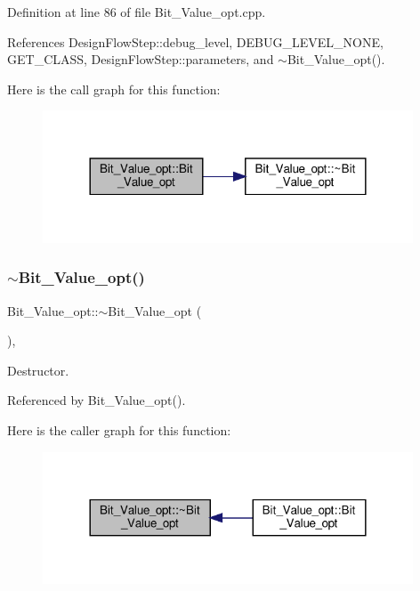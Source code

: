 Definition at line 86 of file Bit\+\_\+\+Value\+\_\+opt.\+cpp.



References Design\+Flow\+Step\+::debug\+\_\+level, D\+E\+B\+U\+G\+\_\+\+L\+E\+V\+E\+L\+\_\+\+N\+O\+NE, G\+E\+T\+\_\+\+C\+L\+A\+SS, Design\+Flow\+Step\+::parameters, and $\sim$\+Bit\+\_\+\+Value\+\_\+opt().

Here is the call graph for this function\+:
\nopagebreak
\begin{figure}[H]
\begin{center}
\leavevmode
\includegraphics[width=312pt]{dc/d5b/classBit__Value__opt_aa7b2660093d2f3b18277d05e76750df4_cgraph}
\end{center}
\end{figure}
\mbox{\label{classBit__Value__opt_a1b2ac3976ebd70c6afdc8d6ec1176b3d}} 
\subsubsection{\texorpdfstring{$\sim$\+Bit\+\_\+\+Value\+\_\+opt()}{~Bit\_Value\_opt()}}
{\footnotesize\ttfamily Bit\+\_\+\+Value\+\_\+opt\+::$\sim$\+Bit\+\_\+\+Value\+\_\+opt (\begin{DoxyParamCaption}{ }\end{DoxyParamCaption})\hspace{0.3cm}{\ttfamily [override]}, {\ttfamily [default]}}



Destructor. 



Referenced by Bit\+\_\+\+Value\+\_\+opt().

Here is the caller graph for this function\+:
\nopagebreak
\begin{figure}[H]
\begin{center}
\leavevmode
\includegraphics[width=312pt]{dc/d5b/classBit__Value__opt_a1b2ac3976ebd70c6afdc8d6ec1176b3d_icgraph}
\end{center}
\end{figure}


